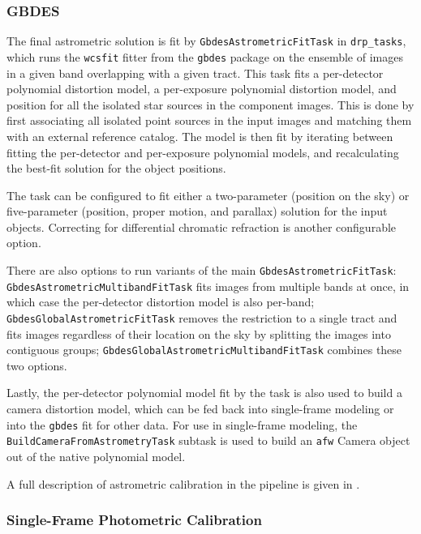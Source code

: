 \subsubsection{GBDES}
\label{sec:gbdes}

The final astrometric solution is fit by \texttt{Gbdes\-Astrometric\-Fit\-Task} in \texttt{drp\_tasks}, which runs the \texttt{wcsfit} fitter from the \texttt{gbdes} package \citep{2022ascl.soft10011B,2017PASP..129g4503B} on the ensemble of images in a given band overlapping with a given tract.
This task fits a per-detector polynomial distortion model, a per-exposure polynomial distortion model, and position for all the isolated star sources in the component images.
This is done by first associating all isolated point sources in the input images and matching them with an external reference catalog.
The model is then fit by iterating between fitting the per-detector and per-exposure polynomial models, and recalculating the best-fit solution for the object positions.

The task can be configured to fit either a two-parameter (position on the sky) or five-parameter (position, proper motion, and parallax) solution for the input objects.
Correcting for differential chromatic refraction is another configurable option.

There are also options to run variants of the main \texttt{Gbdes\-Astrometric\-Fit\-Task}: \texttt{Gbdes\-Astrometric\-Multiband\-Fit\-Task} fits images from multiple bands at once, in which case the per-detector distortion model is also per-band; \texttt{Gbdes\-Global\-Astrometric\-Fit\-Task} removes the restriction to a single tract and fits images regardless of their location on the sky by splitting the images into contiguous groups; \texttt{Gbdes\-Global\-Astrometric\-Multiband\-Fit\-Task} combines these two options.

Lastly, the per-detector polynomial model fit by the task is also used to build a camera distortion model, which can be fed back into single-frame modeling or into the \texttt{gbdes} fit for other data.
For use in single-frame modeling, the \texttt{Build\-Camera\-From\-Astrometry\-Task} subtask is used to build an \texttt{afw} Camera object out of the native polynomial model.

A full description of astrometric calibration in the pipeline is given in \citet{DMTN-266}.

\subsubsection{Single-Frame Photometric Calibration}
\label{sec:photoCal}


